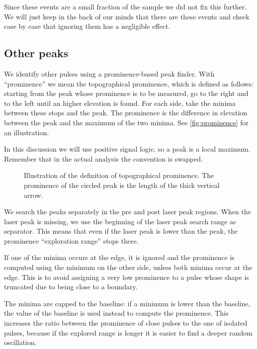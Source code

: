 Since these events are a small fraction of the sample we did not fix this
further. We will just keep in the back of our minds that there are these events
and check case by case that ignoring them has a negligible effect.

\subsection{Other peaks}

We identify other pulses using a prominence-based peak finder. With
``prominence'' we mean the topographical prominence, which is defined as
follows: starting from the peak whose prominence is to be measured, go to the
right and to the left until an higher elevation is found. For each side, take
the minima between these stops and the peak. The prominence is the difference
in elevation between the peak and the maximum of the two minima. See
\autoref{fig:prominence} for an illustration.

In this discussion we will use positive signal logic, so a peak is a local
maximum. Remember that in the actual analysis the convention is swapped.

\begin{figure}
    
    
    \caption{\label{fig:prominence} Illustration of the definition of
    topographical prominence. The prominence of the circled peak is the length
    of the thick vertical arrow.}
    
\end{figure}

We search the peaks separately in the pre and post laser peak regions. When the
laser peak is missing, we use the beginning of the laser peak search range as
separator. This means that even if the laser peak is lower than the peak, the
prominence ``exploration range'' stops there.

If one of the minima occurs at the edge, it is ignored and the prominence is
computed using the minimum on the other side, unless both minima occur at the
edge. This is to avoid assigning a very low prominence to a pulse whose shape
is truncated due to being close to a boundary.

The minima are capped to the baseline: if a minimum is lower than the baseline,
the value of the baseline is used instead to compute the prominence. This
increases the ratio between the prominence of close pulses to the one of
isolated pulses, because if the explored range is longer it is easier to find a
deeper random oscillation.

